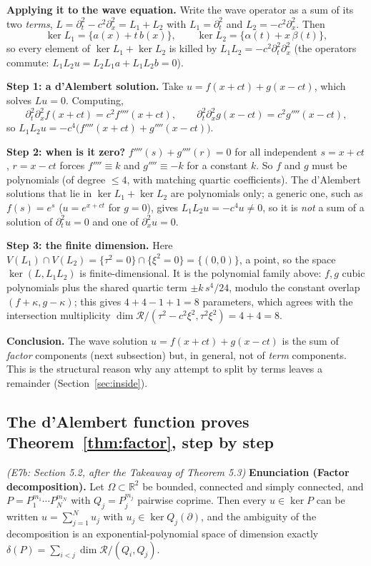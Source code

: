 \documentclass[11pt]{article}
\theoremstyle{plain}
\theoremstyle{definition}
\theoremstyle{remark}
\newcommand{\R}{\mathbb{R}}
\newcommand{\ring}{\mathcal{R}}            %
\newcommand{\Var}{V}                        %
\begin{document}
\medskip\textbf{Applying it to the wave equation.} Write the wave operator as a sum of its two \emph{terms}, $L=\partial_t^2-c^2\partial_x^2=L_1+L_2$ with $L_1=\partial_t^2$ and $L_2=-c^2\partial_x^2$. Then
\[
\ker L_1=\{a(x)+t\,b(x)\},\qquad \ker L_2=\{\alpha(t)+x\,\beta(t)\},
\]
so every element of $\ker L_1+\ker L_2$ is killed by $L_1L_2=-c^2\partial_t^2\partial_x^2$ (the operators commute: $L_1L_2u=L_2L_1a+L_1L_2b=0$).

\medskip\textbf{Step 1: a d'Alembert solution.} Take $u=f(x+ct)+g(x-ct)$, which solves $Lu=0$. Computing,
\[
\partial_t^2\partial_x^2f(x+ct)=c^2f''''(x+ct),\qquad \partial_t^2\partial_x^2g(x-ct)=c^2g''''(x-ct),
\]
so $L_1L_2u=-c^4\big(f''''(x+ct)+g''''(x-ct)\big)$.

\medskip\textbf{Step 2: when is it zero?} $f''''(s)+g''''(r)=0$ for all independent $s=x+ct$, $r=x-ct$ forces $f''''\equiv k$ and $g''''\equiv-k$ for a constant $k$. So $f$ and $g$ must be polynomials (of degree $\le4$, with matching quartic coefficients). The d'Alembert solutions that lie in $\ker L_1+\ker L_2$ are polynomials only; a generic one, such as $f(s)=e^s$ ($u=e^{x+ct}$ for $g=0$), gives $L_1L_2u=-c^4u\ne0$, so it is \emph{not} a sum of a solution of $\partial_t^2u=0$ and one of $\partial_x^2u=0$.

\medskip\textbf{Step 3: the finite dimension.} Here $\Var(L_1)\cap\Var(L_2)=\{\tau^2=0\}\cap\{\xi^2=0\}=\{(0,0)\}$, a point, so the space $\ker(L,L_1L_2)$ is finite-dimensional. It is the polynomial family above: $f,g$ cubic polynomials plus the shared quartic term $\pm k\,s^4/24$, modulo the constant overlap $(f+\kappa,g-\kappa)$; this gives $4+4-1+1=8$ parameters, which agrees with the intersection multiplicity $\dim\ring/(\tau^2-c^2\xi^2,\tau^2\xi^2)=4+4=8$.

\medskip\textbf{Conclusion.} The wave solution $u=f(x+ct)+g(x-ct)$ is the sum of \emph{factor} components (next subsection) but, in general, not of \emph{term} components. This is the structural reason why any attempt to split by terms leaves a remainder (Section~\ref{sec:inside}).

\subsection{The d'Alembert function proves Theorem~\ref{thm:factor}, step by step}\label{expl:E7b}
\noindent\emph{(E7b: Section 5.2, after the Takeaway of Theorem 5.3)}
\textbf{Enunciation (Factor decomposition).} Let $\Omega\subset\R^2$ be bounded, connected and simply connected, and $P=P_1^{m_1}\cdots P_N^{m_N}$ with $Q_j=P_j^{m_j}$ pairwise coprime. Then every $u\in\ker P$ can be written $u=\sum_{j=1}^Nu_j$ with $u_j\in\ker Q_j(\partial)$, and the ambiguity of the decomposition is an exponential-polynomial space of dimension exactly $\delta(P)=\sum_{i<j}\dim\ring/(Q_i,Q_j)$.
\end{document}
